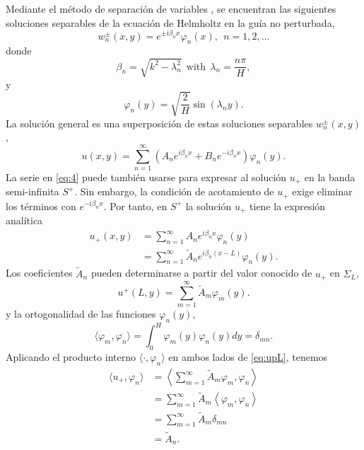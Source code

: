 \documentclass[11pt]{article}
\newcommand{\wt}[1]{\widetilde{#1}}
\begin{document}
Mediante el método de separación de variables \cite{chesnel2025tutorial}, se encuentran las siguientes soluciones separables de la ecuación de Helmholtz en la guía no perturbada,
\begin{equation}
  \label{eq:1}
  w_n^\pm(x,y) = e^{\pm i \beta_n x} \varphi_n(x),~~n=1,2,\ldots
\end{equation}
donde
\begin{equation}
  \label{eq:2}
  \beta_n = \sqrt{k^2 - \lambda_n^2}~~\mathrm{with}~~\lambda_n = \frac{n\pi}{H},
\end{equation}
y
\begin{equation}
  \label{eq:3}
  \varphi_n(y) = \sqrt{\frac{2}{H}}\sin(\lambda_n y).
\end{equation}
La solución general es una superposición de estas soluciones separables $w_n^\pm(x,y)$,
\begin{equation}
  \label{eq:4}
  u(x,y) = \sum_{n=1}^\infty \left(A_n e^{i \beta_n x} + B_n e^{-i\beta_n x}\right)\varphi_n(y).
\end{equation}
La serie en \eqref{eq:4} puede también usarse para expresar al solución $u_+$ en la banda semi-infinita $S^+$. Sin embargo, la condición de acotamiento de $u_+$ exige eliminar los términos con $e^{-i\beta_n x}$. Por tanto, en $S^+$ la solución $u_+$ tiene la expresión analítica
\begin{align}
  \label{eq:5}
  u_+(x,y) &= \sum_{n=1}^\infty A_n e^{i \beta_n x}\varphi_n(y) \\
           &= \sum_{n=1}^\infty \wt{A}_n e^{i \beta_n (x-L)}\varphi_n(y).\label{eq:sum_wtA}
\end{align}
Los coeficientes $\wt{A}_n$ pueden determinarse a partir del valor conocido de $u_+$ en $\Sigma_L$, 
\begin{equation}
  \label{eq:upL}
  u^+(L,y) = \sum_{m=1}^\infty \wt{A}_m \varphi_m(y).             
\end{equation}
y la ortogonalidad de las funciones $\varphi_n(y)$,  
\begin{equation}
  \label{eq:6}
  \langle \varphi_m,\varphi_n \rangle = \int_0^H \varphi_m(y) \varphi_n(y) dy = \delta_{mn}.
\end{equation}
Aplicando el producto interno $\langle \cdot, \varphi_n \rangle$ en ambos lados de \eqref{eq:upL}, tenemos
\begin{align}
  \langle u_+, \varphi_n \rangle &= \left\langle \sum_{m=1}^\infty \wt{A}_m \varphi_m , \varphi_n \right\rangle \\
                                 &= \sum_{m=1}^\infty \wt{A}_m \left\langle \varphi_m , \varphi_n \right\rangle \\
                                 &= \sum_{m=1}^\infty \wt{A}_m \delta_{mn} \\                                  
                                 &= \wt{A}_n.\label{eq:wtA}
\end{align}
\end{document}
